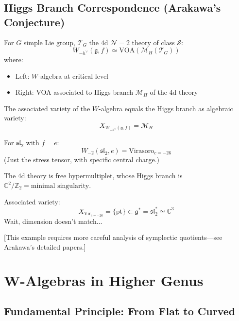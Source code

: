 \subsection{Higgs Branch Correspondence (Arakawa's Conjecture)}

\begin{conjecture}
\label{conj:higgs-branch}
For $G$ simple Lie group, $\mathcal{T}_G$ the 4d $\mathcal{N}=2$ theory of class $\mathcal{S}$:
$$W_{-h^\vee}(\mathfrak{g}, f) \simeq \text{VOA}(\mathcal{M}_H(\mathcal{T}_G))$$
where:
\begin{itemize}
\item Left: $W$-algebra at critical level
\item Right: VOA associated to Higgs branch $\mathcal{M}_H$ of the 4d theory
\end{itemize}

The associated variety of the $W$-algebra equals the Higgs branch as algebraic variety:
$$X_{W_{-h^\vee}(\mathfrak{g}, f)} = \mathcal{M}_H$$
\end{conjecture}

\begin{example}
For $\mathfrak{sl}_2$ with $f = e$:
$$W_{-2}(\mathfrak{sl}_2, e) = \text{Virasoro}_{c=-26}$$
(Just the stress tensor, with specific central charge.)

The 4d theory is free hypermultiplet, whose Higgs branch is $\mathbb{C}^2/\mathbb{Z}_2 = \text{minimal singularity}$.

Associated variety:
$$X_{\text{Vir}_{c=-26}} = \{\text{pt}\} \subset \mathfrak{g}^* = \mathfrak{sl}_2^* \simeq \mathbb{C}^3$$
Wait, dimension doesn't match...

[This example requires more careful analysis of symplectic quotients—see Arakawa's detailed papers.]
\end{example}

\section{W-Algebras in Higher Genus}

\subsection{Fundamental Principle: From Flat to Curved}

